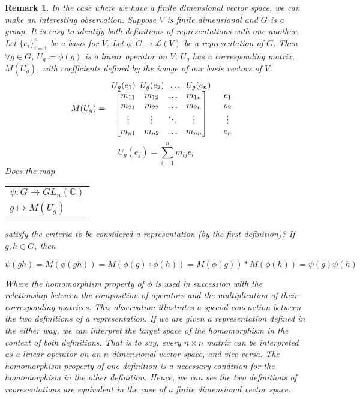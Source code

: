 \documentclass[10pt]{ucthesis}
\newtheorem{remark}[definition]{Remark}
\begin{document}
\begin{remark}
	In the case where we have a finite dimensional vector space, we can make an interesting observation. Suppose $V$ is finite dimensional and $G$ is a group. It is easy to identify both definitions of representations with one another. Let $\{e_i\}_{i=1}^n$ be a basis for $V$. Let $\phi : G \rightarrow \mathcal{L}(V)$ be a representation of $G$. Then $\forall g \in G$, $U_g\coloneq\phi(g)$ is a linear operator on $V$. $U_g$ has a corresponding matrix, $M(U_g)$, with coefficients defined by the image of our basis vectors of $V$.
$$M(U_g) = \begin{array}{c c}
			U_g(e_1) \hspace{2mm} U_g(e_2) \hspace{2mm} \hdots \hspace{2mm}  U_g(e_n) & \\
			\begin{bmatrix}
				m_{11} & m_{12} & \hdots & m_{1n}\\
				m_{21} & m_{22} & \hdots & m_{2n} \\
				\vdots & \vdots & \ddots & \vdots\\
				m_{n1} & m_{n2} & \hdots & m_{nn}\\
			\end{bmatrix}
			&
			\begin{array}{c}
				e_1\\
				e_2\\
				\vdots\\
				e_n\\
			\end{array}
		\end{array}$$
$$U_g(e_j) = \sum_{i=1}^n m_{ij}e_i$$
\renewcommand{\arraystretch}{0.5}
Does the map \begin{tabular}{l}
			$\psi:G\rightarrow GL_n(\mathbb{C})$\\
			\hspace{6mm}$g\mapsto M(U_g)$
       		 \end{tabular}
satisfy the criteria to be considered a representation (by the first definition)? If $g,h \in G$, then

	$$\psi(gh) = M(\phi(gh)) = M(\phi(g)\circ \phi(h)) = M(\phi(g))*M(\phi(h)) = \psi(g)\psi(h)$$

Where the homomorphism property of $\phi$ is used in succession with the relationship between the composition of operators and the multiplication of their corresponding matrices. This observation illustrates a special conenction between the two definitions of a representation. If we are given a representation defined in the either way, we can interpret the target space of the homomorphism in the context of both definitions. That is to say, every $n\times n$ matrix can be interpreted as a linear operator on an $n$-dimensional vector space, and vice-versa. The homomorphism property of one definition is a necessary condition for the homomorphism in the other definition. Hence, we can see the two definitions of representations are equivalent in the case of a finite dimensional vector space.
\end{remark}
\end{document}
